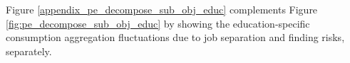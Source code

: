 
Figure \ref{appendix_pe_decompose_sub_obj_educ} complements Figure \ref{fig:pe_decompose_sub_obj_educ} by showing the education-specific consumption aggregation fluctuations due to job separation and finding risks, separately. 


